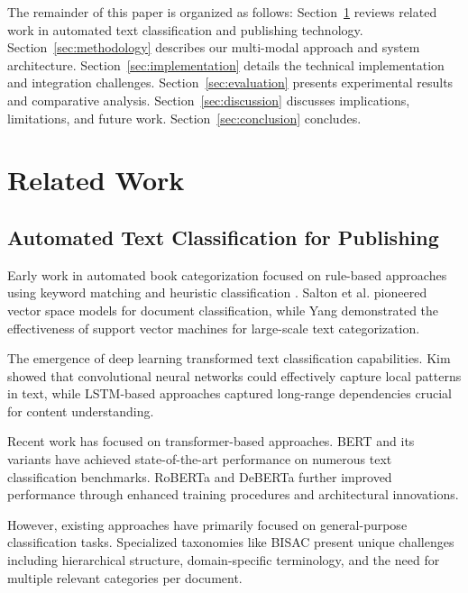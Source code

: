 \documentclass{article}
\begin{document}
The remainder of this paper is organized as follows: Section~\ref{sec:related} reviews related work in automated text classification and publishing technology. Section~\ref{sec:methodology} describes our multi-modal approach and system architecture. Section~\ref{sec:implementation} details the technical implementation and integration challenges. Section~\ref{sec:evaluation} presents experimental results and comparative analysis. Section~\ref{sec:discussion} discusses implications, limitations, and future work. Section~\ref{sec:conclusion} concludes.

\section{Related Work}
\label{sec:related}

\subsection{Automated Text Classification for Publishing}

Early work in automated book categorization focused on rule-based approaches using keyword matching and heuristic classification \cite{joachims1998text, sebastiani2002machine}. Salton et al. \cite{salton1988} pioneered vector space models for document classification, while Yang \cite{yang1999re} demonstrated the effectiveness of support vector machines for large-scale text categorization.

The emergence of deep learning transformed text classification capabilities. Kim \cite{kim2014convolutional} showed that convolutional neural networks could effectively capture local patterns in text, while LSTM-based approaches \cite{hochreiter1997lstm} captured long-range dependencies crucial for content understanding.

Recent work has focused on transformer-based approaches. BERT \cite{devlin2019bert} and its variants have achieved state-of-the-art performance on numerous text classification benchmarks. RoBERTa \cite{liu2019roberta} and DeBERTa \cite{he2021deberta} further improved performance through enhanced training procedures and architectural innovations.

However, existing approaches have primarily focused on general-purpose classification tasks. Specialized taxonomies like BISAC present unique challenges including hierarchical structure, domain-specific terminology, and the need for multiple relevant categories per document.
\end{document}
